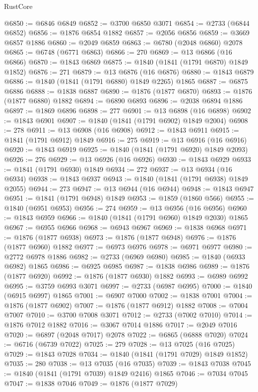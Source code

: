 \begin{lexlean}{RustCore}
\begin{coremodule}
@6850 := @6846 @6849
@6852 := @3700 @6850 @3071
@6854 := @2733 (@6844 @6852)
@6856 := @1876 @6854 @1882
@6857 := @2056 @6856
@6859 := @3669 @6857 @1886
@6860 := @2049 @6859
@6863 := @6780 (@2048 @6860) @2078
@6865 := @6748 (@6771 @6863)
@6866 := 270
@6869 := @13 @6866 (@16 @6866)
@6870 := @1843 @6869
@6875 := @1840 (@1841 (@1791 @6870) @1849 @1852)
@6876 := 271
@6879 := @13 @6876 (@16 @6876)
@6880 := @1843 @6879
@6886 := @1840 (@1841 (@1791 @6880) @1849 @2265) @1865
@6887 := @6875 @6886
@6888 := @1838 @6887
@6890 := @1876 (@1877 @6870)
@6893 := @1876 (@1877 @6880) @1882
@6894 := @6890 @6893
@6896 := @2038 @6894 @1886
@6897 := @1869 @6896
@6898 := 277
@6901 := @13 @6898 (@16 @6898)
@6902 := @1843 @6901
@6907 := @1840 (@1841 (@1791 @6902) @1849 @2004)
@6908 := 278
@6911 := @13 @6908 (@16 @6908)
@6912 := @1843 @6911
@6915 := @1841 (@1791 @6912) @1849
@6916 := 275
@6919 := @13 @6916 (@16 @6916)
@6920 := @1843 @6919
@6925 := @1840 (@1841 (@1791 @6920) @1849 @2093)
@6926 := 276
@6929 := @13 @6926 (@16 @6926)
@6930 := @1843 @6929
@6933 := @1841 (@1791 @6930) @1849
@6934 := 272
@6937 := @13 @6934 (@16 @6934)
@6938 := @1843 @6937
@6943 := @1840 (@1841 (@1791 @6938) @1849 @2055)
@6944 := 273
@6947 := @13 @6944 (@16 @6944)
@6948 := @1843 @6947
@6951 := @1841 (@1791 @6948) @1849
@6953 := @1859 (@1860 @566)
@6955 := @1840 (@6951 @6953)
@6956 := 274
@6959 := @13 @6956 (@16 @6956)
@6960 := @1843 @6959
@6966 := @1840 (@1841 (@1791 @6960) @1849 @2030) @1865
@6967 := @6955 @6966
@6968 := @6943 @6967
@6969 := @1838 @6968
@6971 := @1876 (@1877 @6938)
@6973 := @1876 (@1877 @6948)
@6976 := @1876 (@1877 @6960) @1882
@6977 := @6973 @6976
@6978 := @6971 @6977
@6980 := @2772 @6978 @1886
@6982 := @2733 (@6969 @6980)
@6985 := @1840 (@6933 @6982) @1865
@6986 := @6925 @6985
@6987 := @1838 @6986
@6989 := @1876 (@1877 @6920)
@6992 := @1876 (@1877 @6930) @1882
@6993 := @6989 @6992
@6995 := @3759 @6993 @3071
@6997 := @2733 (@6987 @6995)
@7000 := @1840 (@6915 @6997) @1865
@7001 := @6907 @7000
@7002 := @1838 @7001
@7004 := @1876 (@1877 @6902)
@7007 := @1876 (@1877 @6912) @1882
@7008 := @7004 @7007
@7010 := @3700 @7008 @3071
@7012 := @2733 (@7002 @7010)
@7014 := @1876 @7012 @1882
@7016 := @3067 @7014 @1886
@7017 := @2049 @7016
@7020 := @6897 (@2048 @7017) @2078
@7022 := @6865 (@6888 @7020)
@7024 := @6716 (@6739 @7022)
@7025 := 279
@7028 := @13 @7025 (@16 @7025)
@7029 := @1843 @7028
@7034 := @1840 (@1841 (@1791 @7029) @1849 @1852)
@7035 := 280
@7038 := @13 @7035 (@16 @7035)
@7039 := @1843 @7038
@7045 := @1840 (@1841 (@1791 @7039) @1849 @2416) @1865
@7046 := @7034 @7045
@7047 := @1838 @7046
@7049 := @1876 (@1877 @7029)

\end{coremodule}
\end{lexlean}
